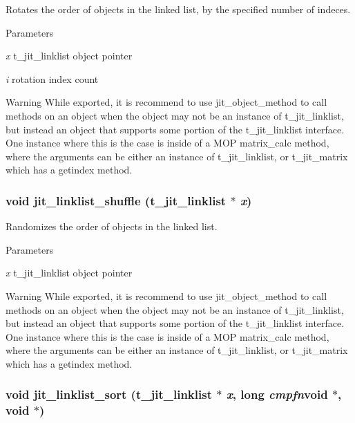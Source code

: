Rotates the order of objects in the linked list, by the specified number of indeces. 
\begin{DoxyParams}{Parameters}
\item[{\em x}]t\_\-jit\_\-linklist object pointer \item[{\em i}]rotation index count\end{DoxyParams}
\begin{DoxyWarning}{Warning}
While exported, it is recommend to use jit\_\-object\_\-method to call methods on an object when the object may not be an instance of t\_\-jit\_\-linklist, but instead an object that supports some portion of the t\_\-jit\_\-linklist interface. One instance where this is the case is inside of a MOP matrix\_\-calc method, where the arguments can be either an instance of t\_\-jit\_\-linklist, or t\_\-jit\_\-matrix which has a getindex method. 
\end{DoxyWarning}
\hypertarget{group__linklistmod_ga28d9508c94d221c86ce8dc6897443992}{
\subsubsection[{jit\_\-linklist\_\-shuffle}]{\setlength{\rightskip}{0pt plus 5cm}void jit\_\-linklist\_\-shuffle (t\_\-jit\_\-linklist $\ast$ {\em x})}}
\label{group__linklistmod_ga28d9508c94d221c86ce8dc6897443992}


Randomizes the order of objects in the linked list. 
\begin{DoxyParams}{Parameters}
\item[{\em x}]t\_\-jit\_\-linklist object pointer\end{DoxyParams}
\begin{DoxyWarning}{Warning}
While exported, it is recommend to use jit\_\-object\_\-method to call methods on an object when the object may not be an instance of t\_\-jit\_\-linklist, but instead an object that supports some portion of the t\_\-jit\_\-linklist interface. One instance where this is the case is inside of a MOP matrix\_\-calc method, where the arguments can be either an instance of t\_\-jit\_\-linklist, or t\_\-jit\_\-matrix which has a getindex method. 
\end{DoxyWarning}
\hypertarget{group__linklistmod_ga31462d238515067801b11b9b55f99e7a}{
\subsubsection[{jit\_\-linklist\_\-sort}]{\setlength{\rightskip}{0pt plus 5cm}void jit\_\-linklist\_\-sort (t\_\-jit\_\-linklist $\ast$ {\em x}, \/  long  {\em cmpfn}void $\ast$, void $\ast$)}}
\label{group__linklistmod_ga31462d238515067801b11b9b55f99e7a}


